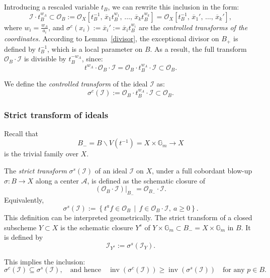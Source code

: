 \documentclass{amsart}
\renewcommand{\setminus}{\smallsetminus}
\newcommand{\inv}{{\operatorname{inv}}}
\begin{document}
Introducing a rescaled variable \( t_B \), we can rewrite this inclusion in the form:
\[
\mathcal{I} \cdot t_B^{w_A} \subset \mathcal{O}_B := \mathcal{O}_X\left[t_B^{-1},\, \overline{x}_1 t_B^{w_1},\, \ldots,\, \overline{x}_k t_B^{w_k} \right] = \mathcal{O}_X\left[t_B^{-1},\, \overline{x}_1',\, \ldots,\, \overline{x}_k'\right],
\]
where \( w_i = \frac{w_A}{a_i} \), and 
 \( \sigma^c(x_i):= \overline{x}_i' := \overline{x}_i t_B^{w_i} \)  are the {\it controlled transforms of the coordinates.}
According to Lemma~\ref{divisor}, the exceptional divisor on \( B_+ \) is defined by \( t_B^{-1} \), which is a local parameter on \( B \). As a result, the full transform \( \mathcal{O}_B \cdot \mathcal{I} \) is divisible by \( t_B^{-w_A} \), since:
\[
t^{w_A} \cdot \mathcal{O}_B \cdot \mathcal{I} = \mathcal{O}_B \cdot t_B^{w_A} \cdot \mathcal{I} \subset \mathcal{O}_B.
\]

\medskip

\noindent
We define the \emph{controlled transform} of the ideal \( \mathcal{I} \) as:
\[
\sigma^c(\mathcal{I}) := \mathcal{O}_B \cdot t_B^{w_A} \cdot \mathcal{I} \subset \mathcal{O}_B.
\]
\subsubsection{Strict transform of ideals}
\label{decrease1}

Recall that
\[
B_- = B \setminus V(t^{-1}) = X \times \mathbb{G}_m \to X
\]
is the trivial family over \( X \).

The \emph{strict transform} \( \sigma^s(\mathcal{I}) \) of an ideal \( \mathcal{I} \) on \( X \), under a full cobordant blow-up \( \sigma: B \to X \) along a center \( \mathcal{A} \), is defined as the schematic closure of 
\[
(\mathcal{O}_B \cdot \mathcal{I})|_{B_-} = \mathcal{O}_{B_-} \cdot \mathcal{I}.
\]
Equivalently,
\[
\sigma^s(\mathcal{I}) := \left\{ t^a f \in \mathcal{O}_B \,\middle|\, f \in \mathcal{O}_B \cdot \mathcal{I},\ a \geq 0 \right\}.
\]
This definition can be interpreted geometrically.
The strict transform of a closed subscheme \( Y \subset X \) is the schematic closure \( Y^s \) of \( Y \times \mathbb{G}_m \subset B_- =X \times \mathbb{G}_m\) in \( B \). It is defined by
\[
\mathcal{I}_{Y^s} := \sigma^s(\mathcal{I}_Y).
\]

This implies the inclusion:
\[
\sigma^c(\mathcal{I}) \subseteq \sigma^s(\mathcal{I}),
\quad \text{and hence} \quad
\inv(\sigma^c(\mathcal{I})) \geq \inv(\sigma^s(\mathcal{I}))
\quad \text{for any } p \in B.
\]
\end{document}
